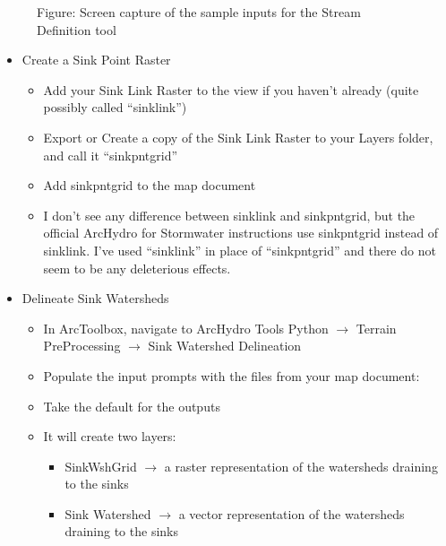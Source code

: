 \documentclass[letterpaper,10pt,english]{sphinxmanual}
\begin{document}
\begin{figure}[htbp]
\centering
\capstart

\noindent{}
\caption{Figure: Screen capture of the sample inputs for the Stream Definition tool}\label{\detokenize{ex_2:id7}}\end{figure}
\begin{itemize}
\item {} 
Create a Sink Point Raster
\begin{itemize}
\item {} 
Add your Sink Link Raster to the view if you haven’t already (quite possibly called “sinklink”)

\item {} 
Export or Create a copy of the Sink Link Raster to your Layers folder, and call it “sinkpntgrid”

\item {} 
Add sinkpntgrid to the map document

\item {} 
 I don’t see any difference between sinklink and sinkpntgrid, but the official ArcHydro for Stormwater instructions use sinkpntgrid instead of sinklink. I’ve used “sinklink” in place of “sinkpntgrid” and there do not seem to be any deleterious effects.

\end{itemize}

\item {} 
Delineate Sink Watersheds
\begin{itemize}
\item {} 
In ArcToolbox, navigate to ArcHydro Tools Python \(\rightarrow\) Terrain PreProcessing \(\rightarrow\) Sink Watershed Delineation

\item {} 
Populate the input prompts with the files from your map document:

\item {} 
Take the default for the outputs

\item {} 
It will create two layers:
\begin{itemize}
\item {} 
SinkWshGrid \(\rightarrow\) a raster representation of the watersheds draining to the sinks

\item {} 
Sink Watershed \(\rightarrow\) a vector representation of the watersheds draining to the sinks

\end{itemize}

\end{itemize}

\end{itemize}
\end{document}
